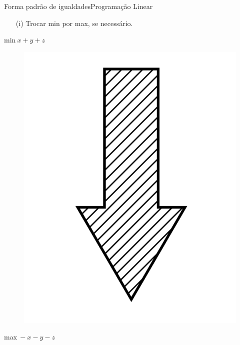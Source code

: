 \documentclass[t]{beamer}
\begin{document}

\begin{ftst}{Forma padrão de igualdades}{Programação Linear}
\begin{itemize}
    \item[(i)] Trocar min por max, se necessário.
\end{itemize}
\vone
\centering $\text{min} \ x + y + z$
\begin{figure}
    \centering
    \includegraphics[scale=0.08]{Figuras/seta.png}
\end{figure}

\centering $\text{max} \ -x - y - z$

\end{ftst}


\end{document}
